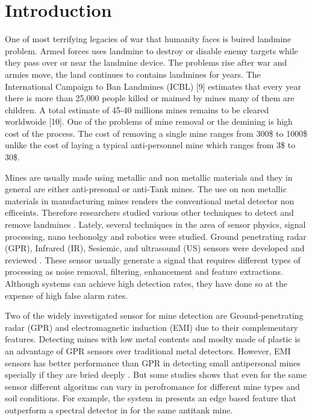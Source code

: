 \documentclass[conference]{IEEEtran}
\begin{document}
\section{Introduction}
\label{sec:introduction}
One of most terrifying legacies of war that humanity faces is buired landmine
problem. Armed forces uses landmine  to destroy or disable enemy targets while
they pass over or near the landmine device. The problems rise after war and
armies move, the land continues to contains landmines for years. The
International Campaign to Ban Landmines (ICBL) [9] estimates that every year
there is more than 25,000 people killed or maimed by mines many of them are
children. A total estimate of 45-40 millions mines remains to be cleared
worldwoide [10]. One of the problems of mine removal or the demining is
high cost of the process. The cost of removing a single mine ranges from  300\$ to 1000\$
unlike the cost of laying a typical anti-personnel mine which ranges from 3\$ to
30\$.

Mines are usually made using metallic and non metallic materials and they in
general are either anti-presonal or anti-Tank mines. The use on non metallic
materials in manufacturing mines renders the conventional metal detector non
efficeints. Therefore researchers studied various other techniques to detect and remove landmines  \cite{Ho2002,Tan2005,Potin2006}.  Lately, several techniques in the area of sensor physics, signal processing, nano techonolgy and robotics were studied.  Ground penetrating radar (GPR), Infrared (IR), Sesiemic,  and ultrasound (US) sensors were developed and reviewed \cite{Scott2004,Ng2008}. These sensor usually generate a signal that requires different types of processing as noise removal, filtering, enhancement and feature extractions\cite{Ng2008,Potin2006}. Although systems can achieve high detection rates, they have done so at the expense of high false alarm rates.   %

 Two of the widely investigated sensor for mine detection are Ground-penetrating radar (GPR) and electromagnetic induction (EMI)  due to their complementary features. Detecting mines with low metal contents and moslty made of plastic is an advantage of GPR sensors over traditional metal detectors.  However, EMI sensors has better performance than GPR in detecting small antipersonal mines specially if they are bried deeply \cite{Frigui2010}. But some studies shows that even for the same sensor different algoritms can vary in perofromance for different mine types and soil conditions. For example, the system in \cite{Frigui2010}  presents an edge based feature that outperform a spectral detector in \cite{Ho2008} for the same antitank mine.
\end{document}
